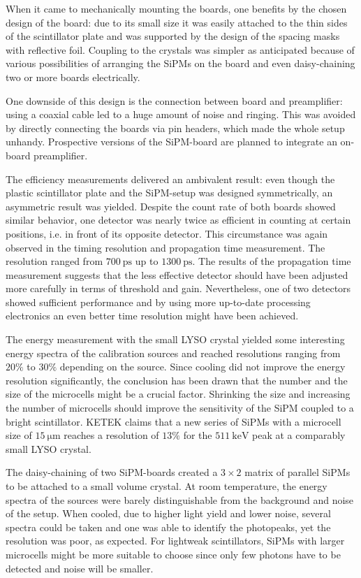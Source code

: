 When it came to mechanically mounting the boards, one benefits by the chosen design of the board: due to its small size it was easily attached to the thin sides of the scintillator plate and was supported by the design of the spacing masks with reflective foil. Coupling to the crystals was simpler as anticipated because of various possibilities of arranging the SiPMs on the board and even daisy-chaining two or more boards electrically. \par 
One downside of this design is the connection between board and preamplifier: using a coaxial cable led to a huge amount of noise and ringing. This was avoided by directly connecting the boards via pin headers, which made the whole setup unhandy. Prospective versions of the SiPM-board are planned to integrate an on-board preamplifier. \par 
The efficiency measurements delivered an ambivalent result: even though the plastic scintillator plate and the SiPM-setup was designed symmetrically, an asymmetric result was yielded. Despite the count rate of both boards showed similar behavior, one detector was nearly twice as efficient in counting at certain positions, i.e. in front of its opposite detector. This circumstance was again observed in the timing resolution and propagation time measurement. The resolution ranged from $\SI{700}{\pico\second}$ up to $\SI{1300}{\pico\second}$. The results of the propagation time measurement suggests that the less effective detector should have been adjusted more carefully in terms of threshold and gain. Nevertheless, one of two detectors showed sufficient performance and by using more up-to-date processing electronics an even better time resolution might have been achieved. \par 
The energy measurement with the small LYSO crystal yielded some interesting energy spectra of the calibration sources and reached resolutions ranging from $20\%$ to $30\%$ depending on the source. Since cooling did not improve the energy resolution significantly, the conclusion has been drawn that the number and the size of the microcells might be a crucial factor. Shrinking the size and increasing the number of microcells should improve the sensitivity of the SiPM coupled to a bright scintillator. KETEK claims \cite{ketek_preamp} that a new series of SiPMs with a microcell size of $\SI{15}{\micro\meter}$ reaches a resolution of $13\%$ for the $\SI{511}{\keV}$ peak at a comparably small LYSO crystal. \par 
The daisy-chaining of two SiPM-boards created a $3\times 2$ matrix of parallel SiPMs to be attached to a small volume \pwo{} crystal. At room temperature, the energy spectra of the sources were barely distinguishable from the background and noise of the setup. When cooled, due to higher light yield and lower noise, several spectra could be taken and one was able to identify the photopeaks, yet the resolution was poor, as expected. For lightweak scintillators, SiPMs with larger microcells might be more suitable to choose since only few photons have to be detected and noise will be smaller. \par 
